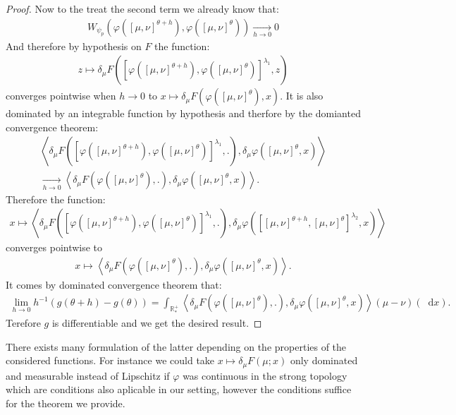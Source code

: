 \documentclass[11pt,a4paper]{article}
\newcommand{\RRP}{\mathbb{R}^+_*}
\newcommand{\brac}[1]{\left\langle#1\right\rangle}
\newcommand{\dd}{\mathop{}\!\mathrm{d}}
\begin{document}
\begin{proof}
    Now to the treat the second term we already know that:
    \begin{align*}
        W_{\psi_p}\left(\varphi\left([\mu,\nu]^{\theta + h}\right), \varphi\left([\mu,\nu]^{\theta}\right) \right) \xrightarrow[h \to 0]{} 0
    \end{align*}
    And therefore by hypothesis on $F$ the function:
    \begin{align*}
        z \mapsto \delta_\mu F\left(\left[\varphi\left([\mu,\nu]^{\theta + h}\right),\varphi\left([\mu,\nu]^{\theta}\right)\right]^{\lambda_1}, z\right)
    \end{align*}
    converges pointwise when $h \to 0$ to $x \mapsto \delta_\mu F\left(\varphi\left([\mu,\nu]^{\theta}\right), x\right)$. It is also dominated by an integrable function by hypothesis and therfore by the domianted convergence theorem:
    \begin{multline*}
        \brac{\delta_\mu F\left(\left[\varphi\left([\mu,\nu]^{\theta + h}\right),\varphi\left([\mu,\nu]^{\theta}\right)\right]^{\lambda_1}, . \right) ,\delta_\mu \varphi\left([\mu,\nu]^{\theta } ,x\right)} \\
        \xrightarrow[h \to 0]{} \brac{\delta_\mu F\left(\varphi\left([\mu,\nu]^{\theta}\right), . \right) ,\delta_\mu \varphi\left([\mu,\nu]^{\theta } ,x\right)}.
    \end{multline*}
    Therefore the function:
    \begin{align*}
        x \mapsto \brac{\delta_\mu F\left(\left[\varphi\left([\mu,\nu]^{\theta + h}\right),\varphi\left([\mu,\nu]^{\theta}\right)\right]^{\lambda_1}, . \right),\delta_\mu \varphi\left(\left[ [\mu,\nu]^{\theta + h}, [\mu,\nu]^{\theta }\right]^{\lambda_2} ,x\right)}
    \end{align*}
    converges pointwise to
    \begin{align*}
        x \mapsto \brac{\delta_\mu F\left(\varphi\left([\mu,\nu]^{\theta}\right), . \right),\delta_\mu \varphi\left([\mu,\nu]^{\theta } ,x\right)}.
    \end{align*}
    It comes by dominated convergence theorem that:
    \begin{align*}
        \lim\limits_{h \to 0} h^{-1}\left(g(\theta + h) - g(\theta)\right) = \int_{\RRP} \brac{\delta_\mu F\left(\varphi\left([\mu,\nu]^{\theta}\right), . \right),\delta_\mu \varphi\left([\mu,\nu]^{\theta } ,x\right)}(\mu -\nu)(\dd x).
    \end{align*}
    Terefore $g$ is differentiable and we get the desired result.
\end{proof}
There exists many formulation of the latter depending on the properties of the considered functions. For instance we could take $x \mapsto \delta_\mu F(\mu;x)$ only dominated and measurable instead of Lipschitz if $\varphi$ was continuous in the strong topology which are conditions also aplicable in our setting, however the conditions suffice for the theorem we provide.
\end{document}
